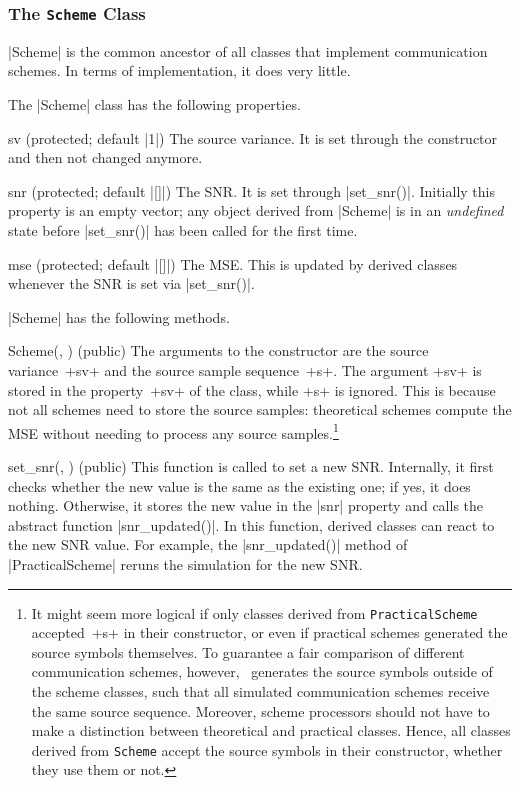\subsubsection{The \texttt{Scheme} Class}

|Scheme| is the common ancestor of all classes that implement communication
schemes. In terms of implementation, it does very little. 

The |Scheme| class has the following properties.
\begin{property}{sv (protected; default |1|)}
  The source variance. It is set through the constructor and then not
  changed anymore.
\end{property}
\begin{property}{snr (protected; default |[]|)}
  The SNR. It is set through |set_snr()|. Initially this property is an empty
  vector; any object derived from |Scheme| is in an \emph{undefined} state
  before |set_snr()| has been called for the first time.
\end{property}
\begin{property}{mse (protected; default |[]|)}
  The MSE. This is updated by derived classes whenever the SNR is set
  via |set_snr()|.
\end{property}

|Scheme| has the following methods.
\begin{method}{Scheme(, ) (public)}
  The arguments to the constructor are the source
  variance~+sv+ and the source sample sequence~+s+. The argument +sv+ is
  stored in the property~+sv+ of the class, while +s+ is ignored. This
  is because not all schemes need to store the source samples: theoretical
  schemes compute the MSE without needing to process any source
  samples.\footnote{%
  It might seem more logical if only classes derived from
  \texttt{PracticalScheme} accepted~+s+ in their constructor, or even if
  practical schemes generated the source symbols themselves. To guarantee a
  fair comparison of different communication schemes, however, \jscsim\
  generates the source symbols outside of the scheme classes, such that all
  simulated communication schemes receive the same source sequence.
  Moreover, scheme processors should not have to make a distinction between
  theoretical and practical classes. Hence, all classes derived from
  \texttt{Scheme} accept the source symbols in their constructor, whether they
  use them or not.}
\end{method}

\begin{method}{set_snr(\obj, ) (public)}
  This function is called to set a new SNR.
  Internally, it first checks whether the new value is the same as the
  existing one; if yes, it does nothing. Otherwise, it stores the new value in
  the |snr| property and calls the abstract function |snr_updated()|. In this
  function, derived classes can react to the new SNR value. For example, the
  |snr_updated()| method of |PracticalScheme| reruns the simulation for the
  new SNR. 
\end{method}
  
